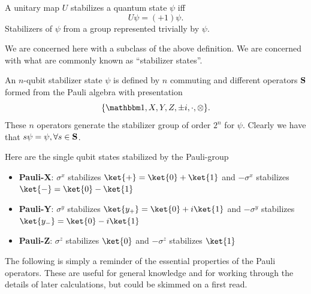 \begin{definition}
A unitary map $U$ stabilizes a quantum state $\psi$ iff 
\begin{equation}
U\psi = (+1)\psi. 
\end{equation} 
Stabilizers of $\psi$ from a group represented trivially by $\psi$.  
\end{definition}

We are concerned here with a subclass of the above definition.  We are concerned with what are commonly known as ``stabilizer states''.  

\begin{definition}
 An $n$-qubit stabilizer state $\psi$ is defined by $n$ commuting and different operators ${\bf S}$ formed from the Pauli algebra with presentation
 \begin{equation}
     \{\I, X, Y, Z, \pm i, \cdot , \otimes\}. 
 \end{equation}
These $n$ operators generate the stabilizer group of order $2^n$ for $\psi$.   Clearly we have that $s\psi = \psi, \forall s\in {\bf S}$.    
\end{definition}

\begin{example}
Here are the single qubit states stabilized by the Pauli-group
\begin{itemize}\addtolength{\itemsep}{-0.25\baselineskip}
 \item[(i)] \textbf{Pauli-X}: $\sigma^x$ stabilizes $\ket{+}=\ket{0}+\ket{1}$
and $-\sigma^x$ stabilizes $\ket{-}=\ket{0}-\ket{1}$
 \item[(ii)] \textbf{Pauli-Y}: $\sigma^y$ stabilizes
$\ket{y_+}=\ket{0}+i\ket{1}$ and $-\sigma^y$ stabilizes
$\ket{y_-}=\ket{0}-i\ket{1}$
 \item[(iii)] \textbf{Pauli-Z}: $\sigma^z$ stabilizes $\ket{0}$ and $-\sigma^z$
stabilizes $\ket{1}$
\end{itemize}
\end{example}

The following is simply a reminder of the essential properties of the Pauli operators.  These are useful for general knowledge and for working through the details of later calculations, but could be skimmed on a first read.  



